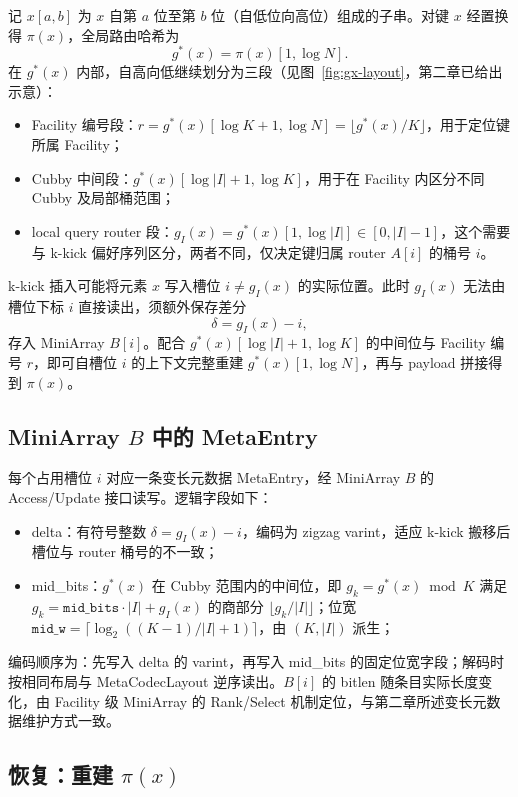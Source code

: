 记 \(x[a,b]\) 为 \(x\) 自第 \(a\) 位至第 \(b\) 位（自低位向高位）组成的子串。对键 \(x\) 经置换得 \(\pi(x)\)，全局路由哈希为
\[
  g^\ast(x)=\pi(x)[1,\log N].
\]
在 \(g^\ast(x)\) 内部，自高向低继续划分为三段（见图~\ref{fig:gx-layout}，第二章已给出示意）：
\begin{itemize}
  \item Facility 编号段：\(r=g^\ast(x)[\log K+1,\log N]=\lfloor g^\ast(x)/K\rfloor\)，用于定位键所属 Facility；
  \item Cubby 中间段：\(g^\ast(x)[\log|I|+1,\log K]\)，用于在 Facility 内区分不同 Cubby 及局部桶范围；
  \item local query router 段：\(g_I(x)=g^\ast(x)[1,\log|I|]\in[0,|I|-1]\)，这个需要与 k-kick 偏好序列区分，两者不同，仅决定键归属 router \(A[i]\) 的桶号 \(i\)。
\end{itemize}

k-kick 插入可能将元素 \(x\) 写入槽位 \(i\neq g_I(x)\) 的实际位置。此时 \(g_I(x)\) 无法由槽位下标 \(i\) 直接读出，须额外保存差分
\[
  \delta=g_I(x)-i,
\]
存入 MiniArray \(B[i]\)。配合 \(g^\ast(x)[\log|I|+1,\log K]\) 的中间位与 Facility 编号 \(r\)，即可自槽位 \(i\) 的上下文完整重建 \(g^\ast(x)[1,\log N]\)，再与 payload 拼接得到 \(\pi(x)\)。

\subsection{MiniArray \texorpdfstring{\(B\)}{B} 中的 MetaEntry}

每个占用槽位 \(i\) 对应一条变长元数据 MetaEntry，经 MiniArray \(B\) 的 Access/Update 接口读写。逻辑字段如下：
\begin{itemize}
  \item delta：有符号整数 \(\delta=g_I(x)-i\)，编码为 zigzag varint，适应 k-kick 搬移后槽位与 router 桶号的不一致；
  \item mid\_bits：\(g^\ast(x)\) 在 Cubby 范围内的中间位，即 \(g_k=g^\ast(x)\bmod K\) 满足 \(g_k=\texttt{mid\_bits}\cdot|I|+g_I(x)\) 的商部分 \(\lfloor g_k/|I|\rfloor\)；位宽 \(\texttt{mid\_w}=\lceil\log_2((K-1)/|I|+1)\rceil\)，由 \((K,|I|)\) 派生；
\end{itemize}

编码顺序为：先写入 delta 的 varint，再写入 mid\_bits 的固定位宽字段；解码时按相同布局与 MetaCodecLayout 逆序读出。\(B[i]\) 的 bitlen 随条目实际长度变化，由 Facility 级 MiniArray 的 Rank/Select 机制定位，与第二章所述变长元数据维护方式一致。

\subsection{恢复：重建 \texorpdfstring{\(\pi(x)\)}{pi(x)}}

